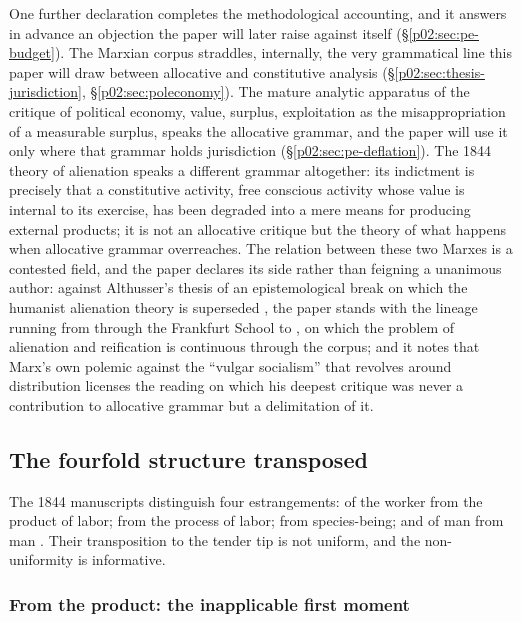 \documentclass[11pt,a4paper]{article}
\begin{document}
One further declaration completes the methodological accounting, and it answers in advance an objection the paper will later raise against itself (\S\ref{p02:sec:pe-budget}). The Marxian corpus straddles, internally, the very grammatical line this paper will draw between allocative and constitutive analysis (\S\ref{p02:sec:thesis-jurisdiction}, \S\ref{p02:sec:poleconomy}). The mature analytic apparatus of the critique of political economy, value, surplus, exploitation as the misappropriation of a measurable surplus, speaks the allocative grammar, and the paper will use it only where that grammar holds jurisdiction (\S\ref{p02:sec:pe-deflation}). The 1844 theory of alienation speaks a different grammar altogether: its indictment is precisely that a constitutive activity, free conscious activity whose value is internal to its exercise, has been degraded into a mere means for producing external products; it is not an allocative critique but the theory of what happens when allocative grammar overreaches. The relation between these two Marxes is a contested field, and the paper declares its side rather than feigning a unanimous author: against Althusser's thesis of an epistemological break on which the humanist alienation theory is superseded \parencite{althusser1965for}, the paper stands with the lineage running from \textcite{lukacs1923history} through the Frankfurt School to \textcite{honneth2008reification}, on which the problem of alienation and reification is continuous through the corpus; and it notes that Marx's own polemic against the ``vulgar socialism'' that revolves around distribution \parencite{marx1875critique} licenses the reading on which his deepest critique was never a contribution to allocative grammar but a delimitation of it.

\subsection{The fourfold structure transposed}
\label{p02:sec:marx-fourfold}

The 1844 manuscripts distinguish four estrangements: of the worker from the product of labor; from the process of labor; from species-being; and of man from man \parencite{marx1844economic}. Their transposition to the tender tip is not uniform, and the non-uniformity is informative.

\subsubsection{From the product: the inapplicable first moment}
\label{p02:sec:marx-product}
\end{document}
